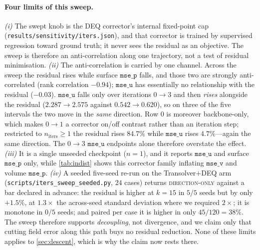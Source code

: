 \paragraph{Four limits of this sweep.} \emph{(i)} The swept
knob is the DEQ corrector's internal fixed-point cap
(\texttt{results/sensitivity/iters.json}), and that corrector is trained by supervised
regression toward ground truth; it never sees the residual as an objective. The sweep is
therefore an anti-correlation along one trajectory, not a test of residual minimisation.
\emph{(ii)} The anti-correlation is carried by one channel. Across the sweep the residual rises while surface
$\texttt{mse\_p}$ falls, and those two are strongly anti-correlated (rank correlation
$-0.94$); $\texttt{mse\_u}$ has essentially no relationship with the residual
($-0.03$). $\texttt{mse\_u}$ falls only over iterations $0\!\to\!3$ and then
\emph{rises} alongside the residual ($2.287\to2.575$ against $0.542\to0.620$), so on
three of the five intervals the two move in the \emph{same} direction. Row $0$ is
moreover backbone-only, which makes $0\!\to\!1$ a corrector on/off contrast rather than
an iteration step; restricted to $n_{\mathrm{iters}}\ge1$ the residual rises $84.7\%$
while $\texttt{mse\_u}$ rises $4.7\%$---again the same direction. The
$0\!\to\!3$ $\texttt{mse\_u}$ endpoints alone therefore
overstate the effect. \emph{(iii)} It is a single unseeded checkpoint ($n=1$), and it reports
$\texttt{mse\_u}$ and surface $\texttt{mse\_p}$ only, while \autoref{tab:indist} shows
this corrector family inflating $\texttt{mse\_v}$ and volume $\texttt{mse\_p}$.
\emph{(iv)} A seeded five-seed re-run on the Transolver$+$DEQ arm
(\texttt{scripts/iters\_sweep\_seeded.py}, $24$ cases) returns \textsc{direction-only}
against a bar declared in advance: the residual is higher at $k{=}15$ in $5/5$ seeds but
by only $+1.5\%$, at $1.3\times$ the across-seed standard deviation where we required
$2\times$; it is monotone in $0/5$ seeds; and paired per case it is higher in only
$45/120=38\%$. The sweep therefore supports \emph{decoupling}, not divergence, and we
claim only that cutting field error along this path buys no residual reduction. None of
these limits applies to \autoref{sec:descent}, which is why the claim now rests there.


